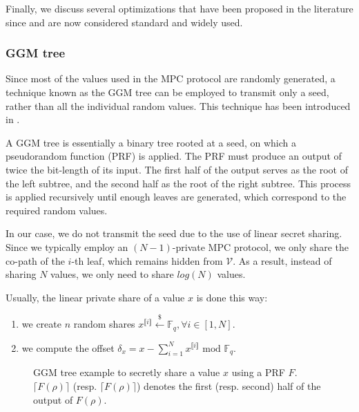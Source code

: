 \documentclass[english]{article}
\newcommand{\lir}{\llbracket i \rrbracket}
\begin{document}
		Finally, we discuss several optimizations that have been proposed in the literature since and are now considered standard and widely used.
		
		\subsubsection{GGM tree}
		Since most of the values used in the MPC protocol are randomly generated, a technique known as the GGM tree can be employed to transmit only a seed, rather than all the individual random values. This technique has been introduced in \cite{GGM86}.
		
		A GGM tree is essentially a binary tree rooted at a seed, on which a pseudorandom function (PRF) is applied. The PRF must produce an output of twice the bit-length of its input. The first half of the output serves as the root of the left subtree, and the second half as the root of the right subtree. This process is applied recursively until enough leaves are generated, which correspond to the required random values.
		
		In our case, we do not transmit the seed due to the use of linear secret sharing. Since we typically employ an $(N-1)$-private MPC protocol, we only share the co-path of the $i$-th leaf, which remains hidden from $\mathcal{V}$. As a result, instead of sharing $N$ values, we only need to share $log(N)$ values.
		
		Usually, the linear private share of a value $x$ is done this way:
		\begin{enumerate}
			\item we create $n$ random shares $x^{\lir} \overset{{\scriptscriptstyle\$}}\gets \mathbb{F}_q, \forall i \in [1,N]$.
			\item we compute the offset $\delta_x = x - \sum_{i=1}^{N} x^{\lir} \text{ mod } \mathbb{F}_q$.
		\end{enumerate}
		
		\begin{figure}[H]
			\begin{center}
				\caption{GGM tree example to secretly share a value $x$ using a PRF $F$. $\lceil F(\rho)\rceil$ (resp. $\lceil F(\rho)\rceil$) denotes the first (resp. second) half of the output of $F(\rho)$.}
				\label{fig:GGMtree}
			\end{center}
		\end{figure}
		
\end{document}
